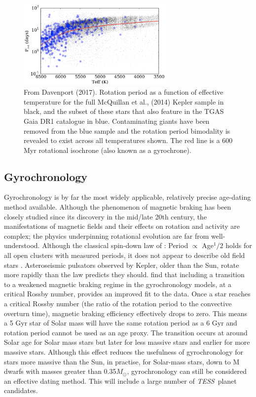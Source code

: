 \documentclass[useAMS, usenatbib, preprint, 12pt]{aastex}
\newcommand{\TESS}{{\it TESS}}
\begin{document}
\begin{figure}
\begin{center}
\includegraphics[width=3in, clip=true]{Davenport.png}
\caption{From Davenport (2017).
    Rotation period as a function of effective
temperature for the full McQuillan et al., (2014) Kepler sample in black, and
the subset of these stars that also feature in the TGAS Gaia DR1 catalogue in
blue. Contaminating giants have been removed from the blue sample and the
rotation period bimodality is revealed to exist across all temperatures shown.
    The red line is a 600 Myr rotational isochrone (also known as a gyrochrone).}
\label{fig:davenport}
\end{center}
\end{figure}

\subsection{Gyrochronology}

Gyrochronology is by far the most widely applicable, relatively precise
age-dating method available.
Although the phenomenon of magnetic braking has been closely studied since its
discovery in the mid/late 20th century, the manifestations of magnetic fields
and their effects on rotation and activity are complex; the physics
underpinning rotational evolution are far from well-understood.
Although the classical spin-down law of \citet{skumanich1972}: Period
$\propto$ Age$^1/2$ holds for all open clusters with measured periods, it does
not appear to describe old field stars \citep{angus2015, van-saders2016}.
Asteroseismic pulsators observed by Kepler, older than the Sun, rotate more
rapidly than the \citet{skumanich1972} law predicts they should.
\citet{van-saders2016} find that including a transition to a weakened magnetic
braking regime in the gyrochronology models, at a critical Rossby number,
provides an improved fit to the data.
Once a star reaches a critical Rossby number (the ratio of the rotation period
to the convective overturn time), magnetic braking efficiency effectively
drops to zero.
This means a 5 Gyr star of Solar mass will have the same rotation period as a
6 Gyr and rotation period cannot be used as an age proxy.
The transition occurs at around Solar age for Solar mass stars but later for
less massive stars and earlier for more massive stars.
Although this effect reduces the usefulness of gyrochronology for stars more
massive than the Sun, in practise, for Solar-mass stars, down to M dwarfs with
masses greater than 0.35$M_\odot$, gyrochronology can still be considered an
effective dating method.
This will include a large number of \TESS\ planet candidates.
\end{document}
